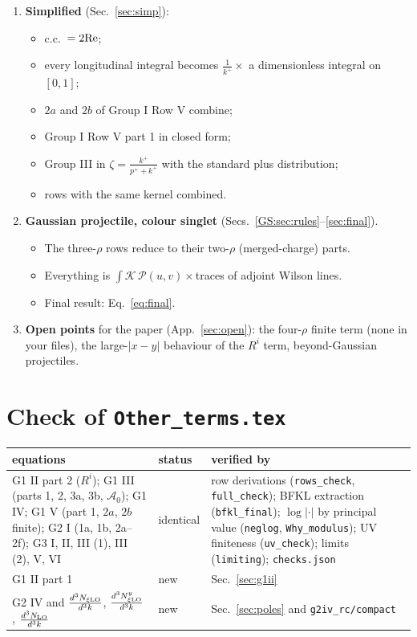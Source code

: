 \documentclass[10pt]{article}
\numberwithin{equation}{section}
\newcommand{\PP}{\mathcal P}
\begin{document}
\begin{enumerate}
\item \textbf{Simplified} (Sec.~\ref{sec:simp}):
\begin{itemize}
\item c.c.\ $=2{\rm Re}$;
\item every longitudinal integral becomes $\frac{1}{k^+}\times$ a dimensionless integral on $[0,1]$;
\item $2a$ and $2b$ of Group I Row V combine;
\item Group I Row V part 1 in closed form;
\item Group III in $\zeta=\frac{k^+}{p^++k^+}$ with the standard plus distribution;
\item rows with the same kernel combined.
\end{itemize}
\item \textbf{Gaussian projectile, colour singlet} (Secs.~\ref{GS:sec:rules}--\ref{sec:final}).
\begin{itemize}
\item The three-$\rho$ rows reduce to their two-$\rho$ (merged-charge) parts.
\item Everything is $\int\mathcal K\,\PP(u,v)\times$traces of adjoint Wilson lines.
\item Final result: Eq.~\eqref{eq:final}.
\end{itemize}
\item \textbf{Open points} for the paper (App.~\ref{sec:open}): the four-$\rho$ finite term (none in your files), the large-$|x-y|$ behaviour of the $R^i$ term, beyond-Gaussian projectiles.
\end{enumerate}

\section{Check of \texttt{Other\_terms.tex}}\label{sec:check}
\begin{center}\small
\begin{tabular}{@{}p{}p{}p{}@{}}\toprule
equations & status & verified by\\\midrule
G1 II part 2 ($R^i$); G1 III (parts 1, 2, 3a, 3b, $\mathcal A_0$); G1 IV; G1 V (part 1, $2a$, $2b$ finite); G2 I (1a, 1b, 2a--2f); G3 I, II, III (1), III (2), V, VI & identical & row derivations (\texttt{rows\_check}, \texttt{full\_check}); BFKL extraction (\texttt{bfkl\_final}); $\log|\cdot|$ by principal value (\texttt{neglog}, \texttt{Why\_modulus}); UV finiteness (\texttt{uv\_check}); limits (\texttt{limiting}); \texttt{checks.json}\\
G1 II part 1 & new & Sec.~\ref{sec:g1ii}\\
G2 IV and $\frac{d^3N_{\xi\rm LO}}{d^3k}$, $\frac{d^3N^y_{\xi\rm LO}}{d^3k}$, $\frac{d^3N_{\rm LO}}{d^3k}$ & new & Sec.~\ref{sec:poles} and \texttt{g2iv\_rc/compact}\\\bottomrule
\end{tabular}
\end{center}
\end{document}
